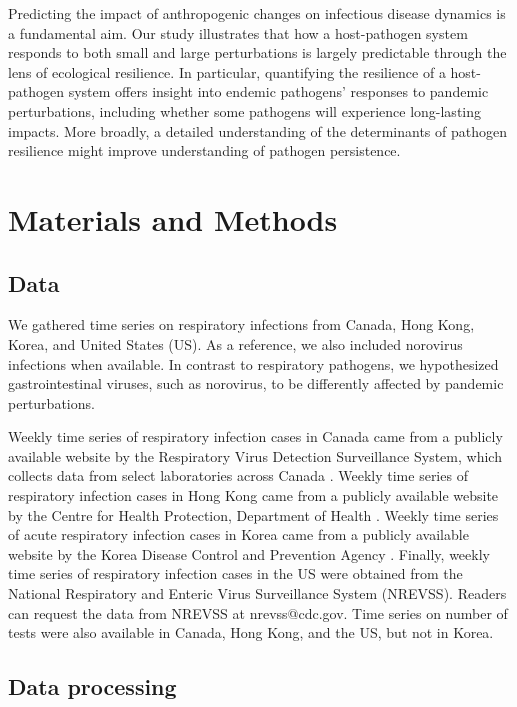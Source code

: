 \documentclass[12pt]{article}
\begin{document}
Predicting the impact of anthropogenic changes on infectious disease dynamics is a fundamental aim.
Our study illustrates that how a host-pathogen system responds to both small and large perturbations is largely predictable through the lens of ecological resilience.
In particular, quantifying the resilience of a host-pathogen system offers insight into endemic pathogens' responses to pandemic perturbations, including whether some pathogens will experience long-lasting impacts.
More broadly, a detailed understanding of the determinants of pathogen resilience might improve understanding of pathogen persistence.

\section*{Materials and Methods}

\subsection*{Data}

We gathered time series on respiratory infections from Canada, Hong Kong, Korea, and United States (US).
As a reference, we also included norovirus infections when available.
In contrast to respiratory pathogens, we hypothesized gastrointestinal viruses, such as norovirus, to be differently affected by pandemic perturbations.

Weekly time series of respiratory infection cases in Canada came from a publicly available website by the Respiratory Virus Detection Surveillance System, which collects data from select laboratories across Canada \citep{phac}.
Weekly time series of respiratory infection cases in Hong Kong came from a publicly available website by the Centre for Health Protection, Department of Health \citep{hkdata,hkdata2}.
Weekly time series of acute respiratory infection cases in Korea came from a publicly available website by the Korea Disease Control and Prevention Agency \citep{kordata}.
Finally, weekly time series of respiratory infection cases in the US were obtained from the National Respiratory and Enteric Virus Surveillance System (NREVSS). Readers can request the data from NREVSS at nrevss@cdc.gov.
Time series on number of tests were also available in Canada, Hong Kong, and the US, but not in Korea.

\subsection*{Data processing}
\end{document}
